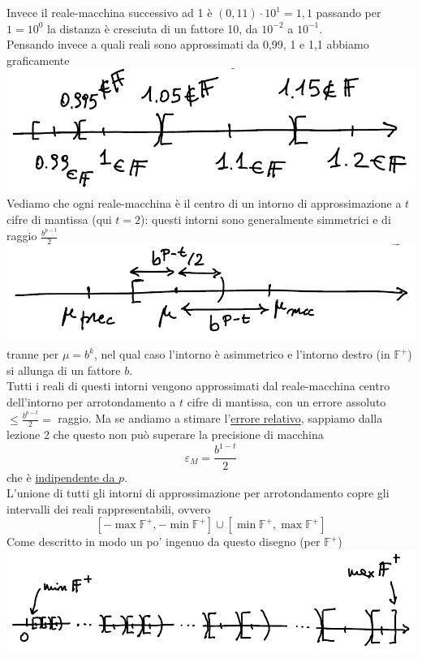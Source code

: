 \documentclass[12pt]{article}
\begin{document}
Invece il reale-macchina successivo ad 1 è $(0,11)\cdot 10^1 = 1,1$ passando per $1 = 10^0$ la distanza è cresciuta di un fattore 10, da $10^{-2}$ a $10^{-1}$.\\
Pensando invece a quali reali sono approssimati da 0,99, 1 e 1,1 abbiamo graficamente \newline
\includegraphics[width=\linewidth]{img7}
Vediamo che ogni reale-macchina è il centro di un intorno di approssimazione a $t$ cifre di mantissa (qui $t=2$): questi intorni sono generalmente simmetrici e di raggio $\frac{b^{p-t}}{2}$ \newline
\includegraphics[width=\linewidth]{img8}
tranne per $\mu = b^k$, nel qual caso l'intorno è asimmetrico e l'intorno destro (in $\mathbb{F}^+$) si allunga di un fattore $b$.\\
Tutti i reali di questi intorni vengono approssimati dal reale-macchina centro dell'intorno per arrotondamento a $t$ cifre di mantissa, con un errore assoluto $\le \frac{b^{p-t}}{2} =$ raggio. Ma se andiamo a stimare l'\underline{errore relativo}, sappiamo dalla lezione 2 che questo non può superare la precisione di macchina \[ \varepsilon_M = \frac{b^{1-t}}{2} \]
che è \underline{indipendente da $p$}.\\
L'unione di tutti gli intorni di approssimazione per arrotondamento copre gli intervalli dei reali rappresentabili, ovvero
\[ [- \max \mathbb{F}^+ , - \min \mathbb{F}^+] \cup [\min \mathbb{F}^+ , \max \mathbb{F}^+]\]
Come descritto in modo un po' ingenuo da questo disegno (per $\mathbb{F}^+$) \newline
\includegraphics[width=\linewidth]{img9}
\end{document}

